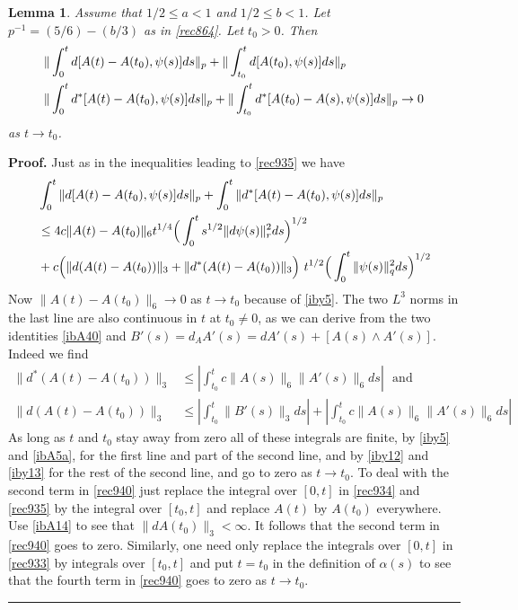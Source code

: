 \documentclass[12pt]{article}
\newtheorem{lemma}[theorem]{Lemma}
\newenvironment{proof}[1][Proof]{\textbf{#1.} }{\ \rule{0.5em}{0.5em}}
\def \({\Big(}
\def \){\Big)}
\def \eref{\eqref}
\numberwithin{equation}{section}
\begin{document}
             \begin{lemma}\label{lemrec31}
 Assume that $1/2 \le a < 1$  and $1/2 \le b < 1$. Let $ p^{-1} = (5/6) - (b/3)$ as in  \eref{rec864}. 
 Let $t_0 >0$. Then 
 \begin{align}
& \| \int_0^t d[A(t) -A(t_0), \psi(s) ] ds\|_p 
+\|\int_{t_0}^t d[A(t_0), \psi(s)] ds\|_p            \label{rec940}  \\                
 &   \| \int_0^t d^*[A(t)-A(t_0), \psi(s) ] ds\|_p   
 +\|\int_{t_0}^t  d^*[A(t_0) - A(s),\psi(s)] ds \|_p       \rightarrow 0 \notag
 \end{align}
 as $t \rightarrow t_0$. 
 \end{lemma}  
              \begin{proof} Just as in the inequalities leading to \eref{rec935} we have
\begin{align}
&\int_0^t  \|d[A(t) -A(t_0), \psi(s) ] ds\|_p +\int_0^t  \|d^*[A(t) -A(t_0), \psi(s) ] ds\|_p \\
& \le 4c \|A(t)- A(t_0)\|_6 t^{1/4}\(\int_0^t  s^{1/2} \|d\psi(s)\|_r ^2ds\)^{1/2}  \notag\\
&+c \(\| d (A(t) -A(t_0))\|_3 + \| d^* (A(t) -A(t_0))\|_3\)\ t^{1/2} \( \int_0^t \|\psi(s)\|_q^2 ds \)^{1/2}  \notag
\end{align}
Now $\| A(t) - A(t_0)\|_6 \rightarrow 0$ as $t \rightarrow t_0$ because of \eref{iby5}.
 The two $L^3$ norms in the last line 
are also continuous in $t$ at $t_0 \ne 0$, as we can derive from the two identities \eref{ibA40} 
 and   $B'(s) =d_A A'(s) = dA'(s) +[A(s)\wedge A'(s)]$. Indeed we find
  \begin{align}
  \|d^*(A(t) - A(t_0))\|_3 &\le | \int_{t_0}^t c \|A(s)\|_6 \|A'(s)\|_6 ds| \ \ \ \text{and} \\
  \|d (A(t) - A(t_0))\|_3 &\le |\int_{t_0}^t \|B'(s)\|_3 ds| +| \int_{t_0}^t c \|A(s)\|_6 \|A'(s)\|_6 ds|
  \end{align}
  As long as $t$ and $t_0$ stay away from zero all of these integrals are finite, 
  by  \eref{iby5} and \eref{ibA5a}, for the first line and part of the  second line, and 
  by \eref{iby12} and \eref{iby13}  for the rest of the second line, and
  go to zero as $t \rightarrow t_0$. To deal with the second term in \eref{rec940} just replace the integral over
  $[0, t]$ in \eref{rec934} and \eref{rec935} by the integral over $[t_0, t]$  and replace
   $A(t)$ by $A(t_0)$ everywhere. Use \eref{ibA14} to see that $\|dA(t_0)\|_3 < \infty$. It follows that the second
   term in \eref{rec940} goes to zero.
   Similarly, one need only replace the integrals over $[0, t]$ in \eref{rec933}  by integrals over $[t_0, t]$
   and put $t =t_0$ in the definition of    $\alpha(s)$ to see that the fourth term in \eref{rec940} goes to zero
   as $t \rightarrow t_0$. 
 \end{proof}
 
\end{document}
